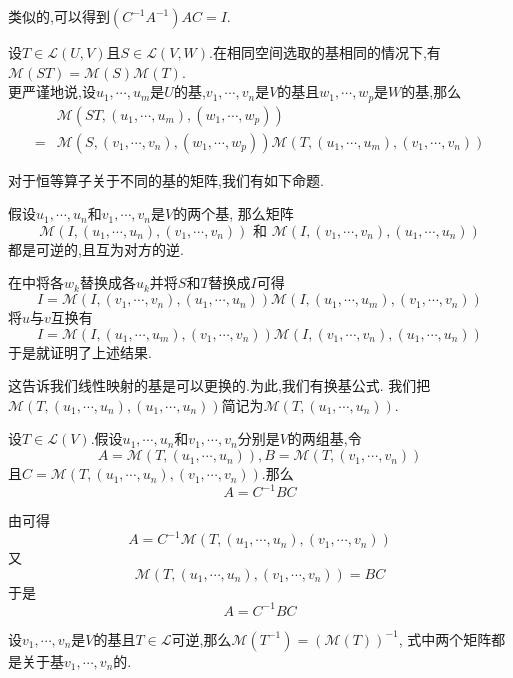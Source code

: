 \documentclass{ctexart}
\begin{document}
类似的,可以得到$(C^{-1}A^{-1})AC=I$.
\begin{formal}[2.3 线性映射之积的乘法]
    设$T\in\mathcal{L}(U,V)$且$S\in\mathcal{L}(V,W)$.在相同空间选取的基相同的情况下,有$\mathcal{M}(ST)=\mathcal{M}(S)\mathcal{M}(T)$.\\
    更严谨地说,设$u_1,\cdots,u_m$是$U$的基,$v_1,\cdots,v_n$是$V$的基且$w_1,\cdots,w_p$是$W$的基,那么
    $$\begin{aligned}
        &\mathcal{M}\left(ST,(u_1,\cdots,u_m),(w_1,\cdots,w_p)\right)\\
        =&\mathcal{M}\left(S,(v_1,\cdots,v_n),(w_1,\cdots,w_p)\right)\mathcal{M}(T,(u_1,\cdots,u_m),(v_1,\cdots,v_n))
    \end{aligned}$$
\end{formal}\noindent
对于恒等算子关于不同的基的矩阵,我们有如下命题.
\begin{formal}[2.4 恒等算子关于两个基的矩阵]
    假设$u_1,\cdots,u_n$和$v_1,\cdots,v_n$是$V$的两个基,
    那么矩阵$$\mathcal{M}\left(I,(u_1,\cdots,u_n),(v_1,\cdots,v_n)\right)\text{\ \ \ 和\ \ \ }\mathcal{M}\left(I,(v_1,\cdots,v_n),(u_1,\cdots,u_n)\right)$$
    都是可逆的,且互为对方的逆.
\end{formal}
\begin{solution}[Proof.]
    在中将各$w_k$替换成各$u_k$并将$S$和$T$替换成$I$可得
    $$I=\mathcal{M}\left(I,(v_1,\cdots,v_n),(u_1,\cdots,u_n)\right)\mathcal{M}(I,(u_1,\cdots,u_m),(v_1,\cdots,v_n))$$
    将$u$与$v$互换有
    $$I=\mathcal{M}(I,(u_1,\cdots,u_m),(v_1,\cdots,v_n))\mathcal{M}\left(I,(v_1,\cdots,v_n),(u_1,\cdots,u_n)\right)$$
    于是就证明了上述结果.
\end{solution}\noindent
这告诉我们线性映射的基是可以更换的.为此,我们有换基公式.
我们把$\mathcal{M}(T,(u_1,\cdots,u_n),(u_1,\cdots,u_n))$简记为$\mathcal{M}(T,(u_1,\cdots,u_n))$.
\begin{formal}[2.5 换基公式]
    设$T\in\mathcal{L}(V)$.假设$u_1,\cdots,u_n$和$v_1,\cdots,v_n$分别是$V$的两组基,令
    $$A=\mathcal{M}\left(T,(u_1,\cdots,u_n)\right),B=\mathcal{M}\left(T,(v_1,\cdots,v_n)\right)$$
    且$C=\mathcal{M}\left(T,(u_1,\cdots,u_n),(v_1,\cdots,v_n)\right)$.那么
    $$A=C^{-1}BC$$
\end{formal}
\begin{solution}[Proof.]
    由可得$$A=C^{-1}\mathcal{M}\left(T,(u_1,\cdots,u_n),(v_1,\cdots,v_n)\right)$$
    又$$\mathcal{M}\left(T,(u_1,\cdots,u_n),(v_1,\cdots,v_n)\right)=BC$$
    于是$$A=C^{-1}BC$$
\end{solution}
\begin{formal}[2.6 逆的矩阵等于矩阵的逆]
    设$v_1,\cdots,v_n$是$V$的基且$T\in\mathcal{L}$可逆,那么$\mathcal{M}\left(T^{-1}\right)=\left(\mathcal{M}(T)\right)^{-1}$,%
    式中两个矩阵都是关于基$v_1,\cdots,v_n$的.
\end{formal}
\end{document}
